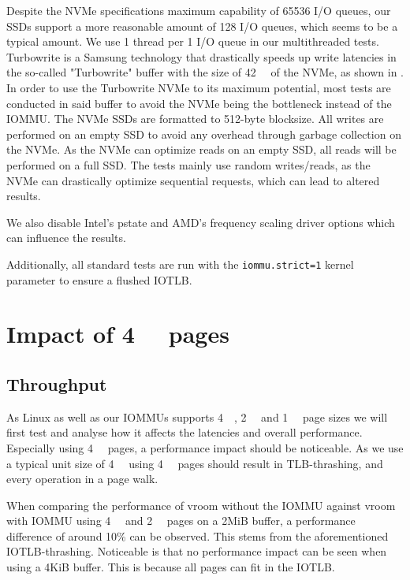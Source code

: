 Despite the NVMe specifications maximum capability of 65536 I/O queues, our SSDs support a more reasonable amount of 128 I/O queues, which seems to be a typical amount.
We use 1 thread per 1 I/O queue in our multithreaded tests. Turbowrite is a Samsung technology that drastically speeds up write latencies in the so-called "Turbowrite" buffer with the size of \qty{42}{\giga\byte} of the NVMe, as shown in \cite{vroom}. In order to use the Turbowrite NVMe to its maximum potential, most tests are conducted in said buffer to avoid the NVMe being the bottleneck instead of the IOMMU.
The NVMe SSDs are formatted to 512-byte blocksize. All writes are performed on an empty SSD to avoid any overhead through garbage collection on the NVMe. As the NVMe can optimize reads on an empty SSD, all reads will be performed on a full SSD. The tests mainly use random writes/reads, as the NVMe can drastically optimize sequential requests, which can lead to altered results.

We also disable Intel's pstate and AMD's frequency scaling driver options which can influence the results.

Additionally, all standard tests are run with the \texttt{iommu.strict=1} kernel parameter to ensure a flushed IOTLB.

\section{Impact of \qty{4}{\kibi\byte} pages}
\subsection{Throughput}
As Linux as well as our IOMMUs supports \qty{4}{\kibi\byte}, \qty{2}{\mebi\byte} and \qty{1}{\gibi\byte} page sizes we will first test and analyse how it affects the latencies and overall performance. Especially using \qty{4}{\kibi\byte} pages, a performance impact should be noticeable. As we use a typical unit size of \qty{4}{\kibi\byte} using \qty{4}{\kibi\byte} pages should result in TLB-thrashing, and every operation in a page walk.

When comparing the performance of vroom without the IOMMU against vroom with IOMMU using \qty{4}{\kibi\byte} and \qty{2}{\mebi\byte} pages on a 2MiB buffer, a performance difference of around 10\% can be observed. This stems from the aforementioned IOTLB-thrashing. Noticeable is that no performance impact can be seen when using a 4KiB buffer. This is because all pages can fit in the IOTLB.

